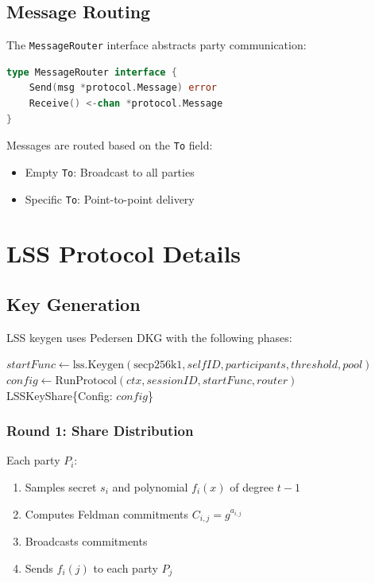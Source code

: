 \documentclass[11pt,twocolumn]{article}
\begin{document}
\subsection{Message Routing}

The \texttt{MessageRouter} interface abstracts party communication:

\begin{lstlisting}[language=Go,basicstyle=\ttfamily\small]
type MessageRouter interface {
    Send(msg *protocol.Message) error
    Receive() <-chan *protocol.Message
}
\end{lstlisting}

Messages are routed based on the \texttt{To} field:
\begin{itemize}
\item Empty \texttt{To}: Broadcast to all parties
\item Specific \texttt{To}: Point-to-point delivery
\end{itemize}

\section{LSS Protocol Details}

\subsection{Key Generation}

LSS keygen uses Pedersen DKG with the following phases:

\begin{algorithm}
\caption{LSS Key Generation}
\label{alg:lss-keygen}
\begin{algorithmic}[1]
    \State $startFunc \gets \text{lss.Keygen}(\text{secp256k1}, selfID, participants, threshold, pool)$
    \State $config \gets \text{RunProtocol}(ctx, sessionID, startFunc, router)$
    \State \Return LSSKeyShare\{Config: $config$\}
\EndProcedure
\end{algorithmic}
\end{algorithm}

\subsubsection{Round 1: Share Distribution}

Each party $P_i$:
\begin{enumerate}
\item Samples secret $s_i$ and polynomial $f_i(x)$ of degree $t-1$
\item Computes Feldman commitments $C_{i,j} = g^{a_{i,j}}$
\item Broadcasts commitments
\item Sends $f_i(j)$ to each party $P_j$
\end{enumerate}
\end{document}
